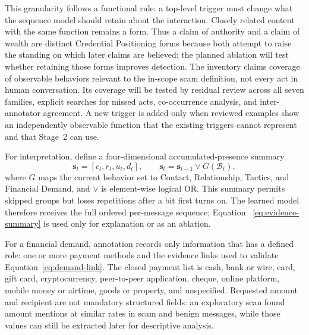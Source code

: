 \documentclass[letterpaper,11pt]{article}
\begin{document}
This granularity follows a functional rule: a top-level trigger must change what
the sequence model should retain about the interaction. Closely related content
with the same function remains a form. Thus a claim of authority and a claim of
wealth are distinct Credential Positioning forms because both attempt to raise
the standing on which later claims are believed; the planned ablation will test
whether retaining those forms improves detection. The inventory claims coverage
of observable behaviors relevant to the in-scope scam definition, not every act
in human conversation. Its coverage will be tested by residual review across all
seven families, explicit searches for missed acts, co-occurrence analysis, and
inter-annotator agreement. A new trigger is added only when reviewed examples
show an independently observable function that the existing triggers cannot
represent and that Stage~2 can use.

For interpretation, define a four-dimensional accumulated-presence summary
\begin{equation}
 \mathbf s_t=[c_t,r_t,u_t,d_t],\qquad
 \mathbf s_t=\mathbf s_{t-1}\lor G(\mathcal B_t),
 \label{eq:evidence-summary}
\end{equation}
where $G$ maps the current behavior set to Contact, Relationship, Tactics, and
Financial Demand, and $\lor$ is element-wise logical OR. This summary permits
skipped groups but loses repetitions after a bit first turns on. The learned
model therefore receives the full ordered per-message sequence; Equation
~\ref{eq:evidence-summary} is used only for explanation or as an ablation.

For a financial demand, annotation records only information that has a defined
role: one or more payment methods and the evidence links used to validate
Equation~\ref{eq:demand-link}. The closed payment list is cash, bank or wire,
card, gift card, cryptocurrency, peer-to-peer application, cheque, online
platform, mobile money or airtime, goods or property, and unspecified. Requested
amount and recipient are not mandatory structured fields: an exploratory scan
found amount mentions at similar rates in scam and benign messages, while those
values can still be extracted later for descriptive analysis.
\end{document}
